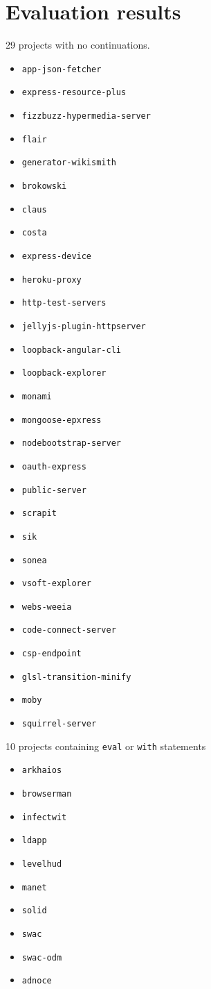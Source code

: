 \appendix

\section{Evaluation results} \label{section:results}

29 projects with no continuations.
\begin{itemize}
\item \texttt{app-json-fetcher}
\item \texttt{express-resource-plus}
\item \texttt{fizzbuzz-hypermedia-server}
\item \texttt{flair}
\item \texttt{generator-wikismith}
\item \texttt{brokowski}
\item \texttt{claus}
\item \texttt{costa}
\item \texttt{express-device}
\item \texttt{heroku-proxy}
\item \texttt{http-test-servers}
\item \texttt{jellyjs-plugin-httpserver}
\item \texttt{loopback-angular-cli}
\item \texttt{loopback-explorer}
\item \texttt{monami}
\item \texttt{mongoose-epxress}
\item \texttt{nodebootstrap-server}
\item \texttt{oauth-express}
\item \texttt{public-server}
\item \texttt{scrapit}
\item \texttt{sik}
\item \texttt{sonea}
\item \texttt{vsoft-explorer}
\item \texttt{webs-weeia}
\item \texttt{code-connect-server}
\item \texttt{csp-endpoint}
\item \texttt{glsl-transition-minify}
\item \texttt{moby}
\item \texttt{squirrel-server}
\end{itemize}

10 projects containing \texttt{eval} or \texttt{with} statements
\begin{itemize}
\item \texttt{arkhaios}
\item \texttt{browserman}
\item \texttt{infectwit}
\item \texttt{ldapp}
\item \texttt{levelhud}
\item \texttt{manet}
\item \texttt{solid}
\item \texttt{swac}
\item \texttt{swac-odm}
\item \texttt{adnoce}
\end{itemize}

